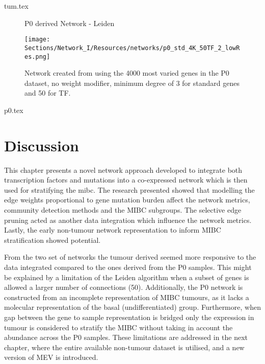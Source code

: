 {tum.tex}

\newpage
{}
\begin{figure}[p]
  \thispagestyle{empty} %
  \centering
  \captionsetup{justification=centering, labelfont=bf}
    \parbox{\textwidth}{\centering \Huge P0 derived Network - Leiden} 
    \vspace{3cm} %
    \texttt{[image: Sections/Network\_I/Resources/networks/p0\_std\_4K\_50TF\_2\_lowRes.png]} %
    \parbox{0.8\textwidth}{\centering Network created from using the 4000 most varied genes in the P0 dataset, no weight modifier, minimum degree of 3 for standard genes and 50 for TF.}
\end{figure}
\restoregeometry
\newpage


{p0.tex}


\section{Discussion}


This chapter presents a novel network approach developed to integrate both transcription factors and mutations into a co-expressed network which is then used for stratifying the \acrlong{mibc}. The research presented showed that modelling the edge weights proportional to gene mutation burden affect the network metrics, community detection methods and the MIBC subgroups. The selective edge pruning  acted as another data integration which influence the network metrics. Lastly, the early non-tumour network representation to inform MIBC stratification showed potential.

From the two set of networks the tumour derived seemed more responsive to the data integrated compared to the ones derived from the P0 samples. This might be explained by a limitation of the Leiden algorithm when a subset of genes is allowed a larger number of connections (50). Additionally, the P0 network is constructed from an incomplete representation of MIBC tumours, as it lacks a molecular representation of the basal (undifferentiated) group. Furthermore, when gap between the gene to sample representation is bridged only the expression in tumour is considered to stratify the MIBC without taking in account the abundance across the P0 samples. These limitations are addressed in the next chapter, where the entire available non-tumour dataset is utilised, and a new version of MEV is introduced.


